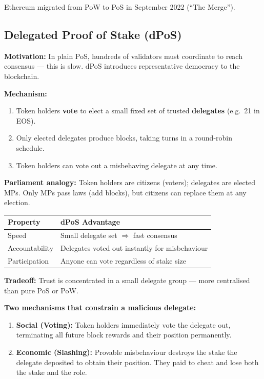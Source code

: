 \documentclass[12pt, a4paper]{article}
\begin{document}
Ethereum migrated from PoW to PoS in September 2022 (``The Merge'').

\subsection{Delegated Proof of Stake (dPoS)}

\textbf{Motivation:} In plain PoS, hundreds of validators must coordinate to reach
consensus --- this is slow. dPoS introduces representative democracy to the blockchain.

\textbf{Mechanism:}
\begin{enumerate}
    \item Token holders \textbf{vote} to elect a small fixed set of trusted
          \textbf{delegates} (e.g.\ 21 in EOS).
    \item Only elected delegates produce blocks, taking turns in a
          round-robin schedule.
    \item Token holders can vote out a misbehaving delegate at any time.
\end{enumerate}

\textbf{Parliament analogy:} Token holders are citizens (voters); delegates are
elected MPs. Only MPs pass laws (add blocks), but citizens can replace them
at any election.

\begin{center}
\begin{tabular}{l l}
\toprule
\textbf{Property} & \textbf{dPoS Advantage} \\
\midrule
Speed           & Small delegate set $\Rightarrow$ fast consensus \\
Accountability  & Delegates voted out instantly for misbehaviour \\
Participation   & Anyone can vote regardless of stake size \\
\bottomrule
\end{tabular}
\end{center}

\textbf{Tradeoff:} Trust is concentrated in a small delegate group --- more
centralised than pure PoS or PoW.

\textbf{Two mechanisms that constrain a malicious delegate:}
\begin{enumerate}
    \item \textbf{Social (Voting):} Token holders immediately vote the delegate out,
          terminating all future block rewards and their position permanently.
    \item \textbf{Economic (Slashing):} Provable misbehaviour destroys the stake
          the delegate deposited to obtain their position. They paid to cheat
          and lose both the stake and the role.
\end{enumerate}
\end{document}
